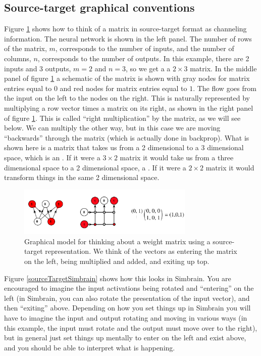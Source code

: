 \subsection{Source-target graphical conventions}

   Figure \ref{sourceTargetConvention} shows how to think of a matrix in 
source-target format as channeling information.  The neural network is shown in
the left panel.  The number of rows of the matrix, $m$, corresponds to the 
number of inputs, and the number of columns, $n$, corresponds to the number of 
outputs.  In this example, there are 2 inputs and 3 outputs, $m=2$ and $n=3$, 
so we get a a $2 \times 3$ matrix.  In the middle panel of figure 
\ref{sourceTargetConvention} a schematic of the matrix is shown with gray nodes 
for matrix entries equal to $0$ and red nodes for matrix entries equal to $1$.
The flow goes from the input on the left to the nodes on the right.  This is 
naturally represented by multiplying a row vector times a matrix on its right,
as shown in the right panel of figure \ref{sourceTargetConvention}.  This is 
called ``right multiplication'' by the matrix, as we will see below.  We can 
multiply the other way, but in this case we are moving ``backwards'' through 
the matrix (which is actually done in backprop).  What is shown here is a 
matrix that takes us from a 2 dimensional to a 3 dimensional space, which is an 
.  If it were a $3 \times 2$ matrix it would take 
us from a three dimensional space to a 2 dimensional space, a 
.  If it were a $2 \times 2$ matrix it would 
transform things in the same 2 dimensional space.

\begin{figure}[h]
\centering
\includegraphics[width=0.75\textwidth]{images/sourceTarget.pdf}
\caption[Jeff Yoshimi.]{Graphical model for thinking about a weight matrix using a source-target representation. We think of the vectors as entering the matrix on the left, being multiplied and added, and exiting up top.}
\label{sourceTargetConvention}
\end{figure}

Figure \ref{sourceTargetSimbrain} shows how this looks in Simbrain. You are encouraged to imagine  the input activations being rotated and ``entering'' on the left (in Simbrain, you can also rotate the presentation of the input vector), and then ``exiting'' above.  Depending on how you set things up in Simbrain you will have to imagine the input and output rotating and moving in various ways (in this example, the input must rotate and the output must move over to the right), but in general just set things up mentally to enter on the left and exist above, and you should be able to interpret what is happening.


